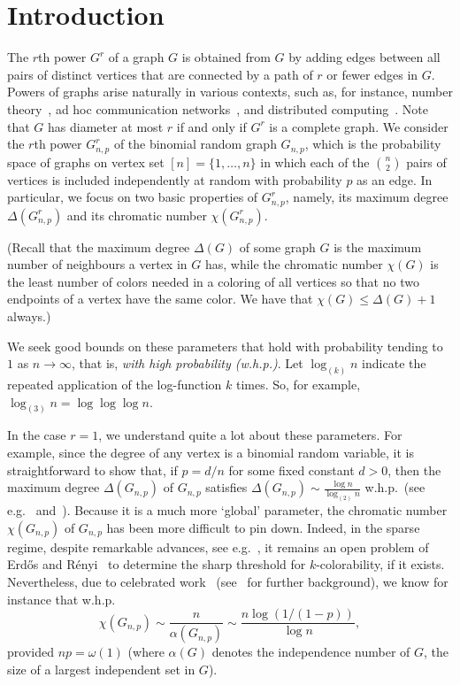 \documentclass[12pt,a4paper]{article}
\theoremstyle{plain}
\begin{document}
\section{Introduction}

The $r$th power $G^r$ of a graph $G$ is obtained from $G$ by adding edges between all pairs of distinct vertices that are connected by a path of $r$ or fewer edges in $G$. Powers of graphs arise naturally in various contexts, such as, for instance, number theory~\cite{Pok14}, ad hoc communication networks~\cite{AgHa03}, and distributed computing~\cite{Lin92}. 
Note that $G$ has diameter at most $r$ if and only if $G^r$ is a complete graph. We consider the $r$th power $G_{n,p}^r$ of the binomial random graph $G_{n,p}$, which is the probability space of graphs on vertex set $[n]=\{1,\dots,n\}$ in which each of the $\binom{n}{2}$ pairs of vertices is included independently at random with probability $p$ as an edge.
In particular, we focus on two basic properties of $G_{n,p}^r$, namely, its maximum degree $\Delta(G_{n,p}^r)$ and its chromatic number $\chi(G_{n,p}^r)$.

(Recall that the maximum degree $\Delta(G)$ of some graph $G$ is the maximum number of neighbours a vertex in $G$ has, while the chromatic number $\chi(G)$ is the least number of colors needed in a coloring of all vertices so that no two endpoints of a vertex have the same color. We have that $\chi(G) \le \Delta(G)+1$ always.)

We seek good bounds on these parameters that hold with probability tending to $1$ as $n\to\infty$, that is, {\em with high probability (w.h.p.)}.
Let $\log_{(k)} n$ indicate the repeated application of the log-function $k$ times.  So, for example, $\log_{(3)} n = \log\log\log n$. 

In the case $r=1$, we understand quite a lot about these parameters. For example, since the degree of any vertex is a binomial random variable, it is straightforward to show that, if $p=d/n$ for some fixed constant $d>0$, then the maximum degree $\Delta(G_{n,p})$ of $G_{n,p}$ satisfies $\Delta(G_{n,p}) \sim \frac{\log n}{\log_{(2)} n}$ w.h.p.~(see e.g.~\cite[Thm.~3.4]{FrKa16} and~\cite{Bol80}).
Because it is a much more `global' parameter, the chromatic number $\chi(G_{n,p})$ of $G_{n,p}$ has been more difficult to pin down. Indeed, in the sparse regime, despite remarkable advances, see e.g.~\cite{AcNa05,CoVi16,ACG22}, it remains an open problem of Erd\H{o}s and R\'enyi~\cite{ErRe60} to determine the sharp threshold for $k$-colorability, if it exists. Nevertheless, due to celebrated work~\cite{Mat87,Bol88,MaKu90,Luc91} (see~\cite{KaMc15} for further background), we know for instance that w.h.p.
\[
\chi(G_{n,p}) \sim \frac{n}{\alpha(G_{n,p})}\sim \frac{n\log(1/(1-p))}{\log n},
\]
provided $np = \omega(1)$ (where $\alpha(G)$ denotes the independence number of $G$, the size of a largest independent set in $G$).
\end{document}
